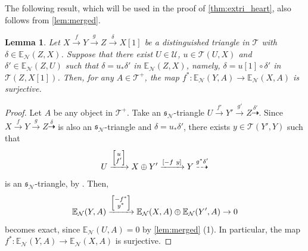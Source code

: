 \documentclass[a4paper,reqno,10pt]{amsart}
\newtheorem{lemma}[lemma]{Lemma}
\theoremstyle{definition}
\theoremstyle{definition}
\theoremstyle{definition}
\theoremstyle{definition}
\theoremstyle{plain}
\newcommand{\fs}{\mathfrak{s}}
\newcommand{\BE}{\mathbb{E}}
\newcommand{\CN}{\mathcal{N}}
\newcommand{\CT}{\mathcal{T}}
\newcommand{\CU}{\mathcal{U}}
\begin{document}
\color{blue}
The following result, which will be used in the proof of \cref{thm:extri_heart}, also follows from \cref{lem:merged}.
\begin{lemma}\label{lem:sN-surj}
Let $X\xrightarrow{f}Y\xrightarrow{g}Z\xrightarrow{\delta}X[1]$ be a distinguished triangle in $\CT$ with $\delta\in\BE_{\CN}(Z,X)$. Suppose that there exist $U\in\CU$, $u\in\CT(U,X)$ and $\delta'\in\BE_{\CN}(Z,U)$ such that $\delta=u_{\ast}\delta'$ in $\BE_{\CN}(Z,X)$, namely, $\delta=u[1]\circ \delta'$ in $\CT(Z,X[1])$. Then, for any $A\in\CT^+$, the map
$f^{\ast}\colon\BE_{\CN}(Y,A)\to\BE_{\CN}(X,A)$ is surjective.
\end{lemma}
\begin{proof}
Let $A$ be any object in $\CT^+$.
Take an $\fs_{\CN}$-triangle $U\xrightarrow{f'}Y'\xrightarrow{g'}Z\overset{\delta'}{\dashrightarrow}$.
Since $X\xrightarrow{f}Y\xrightarrow{g}Z\overset{\delta}{\dashrightarrow}$ is also an $\fs_{\CN}$-triangle and $\delta=u_{\ast}\delta'$,
there exists $y\in\CT(Y',Y)$ such that
\[
U\xrightarrow{{\scriptsize\begin{bmatrix}u\\ f'\end{bmatrix}}}X\oplus Y'\xrightarrow{[-f\ y]}Y\overset{g^{\ast}\delta'}{\dashrightarrow}
\]
is an $\fs_{\CN}$-triangle, by \cite[Proposition~1.20]{LN19}. Then,
\[
\BE_{\CN}(Y,A)\xrightarrow{{\scriptsize\begin{bmatrix}-f^{\ast}\\ y^{\ast}\end{bmatrix}}}
\BE_{\CN}(X,A)\oplus\BE_{\CN}(Y',A)\to0
\]
becomes exact, since $\BE_{\CN}(U,A)=0$ by \cref{lem:merged} {\rm (1)}.
In particular, the map $f^{\ast}\colon\BE_{\CN}(Y,A)\to\BE_{\CN}(X,A)$ is surjective.
\end{proof}
\end{document}
